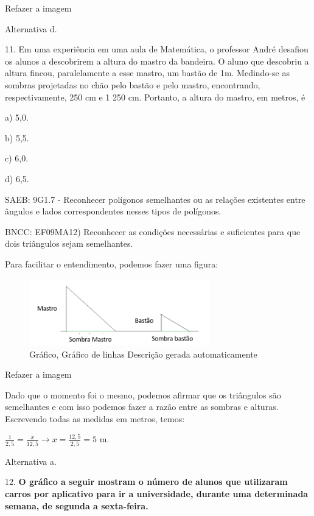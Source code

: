\begin{escolha}
{{{\begin{escolha}
{{{{{\begin{escolha}
\begin{escolha}
{\begin{q°}
Refazer a imagem

Alternativa d.

11. Em uma experiência em uma aula de Matemática, o professor André
desafiou os alunos a descobrirem a altura do mastro da bandeira. O aluno
que descobriu a altura fincou, paralelamente a esse mastro, um bastão de
1m. Medindo-se as sombras projetadas no chão pelo bastão e pelo mastro,
encontrando, respectivamente, 250 cm e 1 250 cm. Portanto, a altura do
mastro, em metros, é

a) 5,0.

b) 5,5.

c) 6,0.

d) 6,5.

SAEB: 9G1.7 - Reconhecer polígonos semelhantes ou as relações existentes
entre ângulos e lados correspondentes nesses tipos de polígonos.

BNCC: EF09MA12) Reconhecer as condições necessárias e suficientes para
que dois triângulos sejam semelhantes.

Para facilitar o entendimento, podemos fazer uma figura:

\begin{figure}
\centering
\includegraphics[width=3.06771in,height=1.1397in]{./_SAEB_9_MAT/media/image257.png}
\caption{Gráfico, Gráfico de linhas Descrição gerada automaticamente}
\end{figure}

Refazer a imagem

Dado que o momento foi o mesmo, podemos afirmar que os triângulos são
semelhantes e com isso podemos fazer a razão entre as sombras e alturas.
Escrevendo todas as medidas em metros, temos:

\(\frac{1}{2,5} = \frac{x}{12,5} \rightarrow x = \frac{12,5}{2,5} = 5\)
m.

Alternativa a.

12. \textbf{O gráfico a seguir mostram o número de alunos que utilizaram
carros por aplicativo para ir a universidade, durante uma determinada
semana, de segunda a sexta-feira.}


\end{q°}}
\end{escolha}
\end{escolha}}}}}}
\end{escolha}}}}
\end{escolha}
